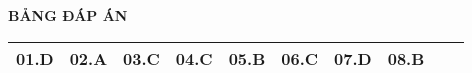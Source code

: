 \loigiai
{
	\begin{center}
		\textbf{BẢNG ĐÁP ÁN}
	\end{center}
	\begin{center}
		\begin{tabular}{|m{2.8em}|m{2.8em}|m{2.8em}|m{2.8em}|m{2.8em}|m{2.8em}|m{2.8em}|m{2.8em}|m{2.8em}|m{2.8em}|}
			\hline
			01.D  & 02.A  & 03.C  & 04.C  & 05.B  & 06.C  & 07.D & 08.B & & \\
			\hline
			
		\end{tabular}
	\end{center}
}
\whiteBGstarEnd